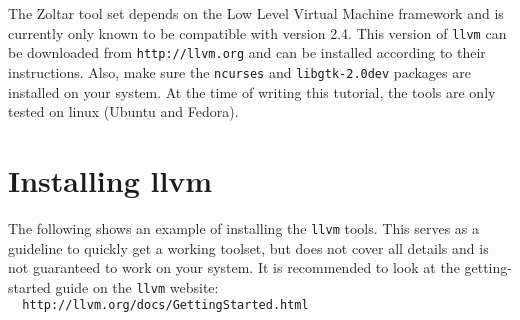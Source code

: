 
The Zoltar tool set depends on the Low Level Virtual Machine framework and
is currently only known to be compatible with version 2.4.
This version of \verb|llvm| can be downloaded from 
\verb|http://llvm.org| and can be installed according to their instructions.
Also, make sure the \verb|ncurses| and \verb|libgtk-2.0dev| packages are
installed on your system.
At the time of writing this tutorial, the tools are only tested on linux (Ubuntu and Fedora).

\section{Installing llvm}
The following shows an example of installing the \verb|llvm| tools.
This serves as a guideline to quickly get a working toolset,
but does not cover all details and is not guaranteed to work on your system.
It is recommended to look at the getting-started guide on the \verb|llvm| website:\\
\verb|  http://llvm.org/docs/GettingStarted.html|

